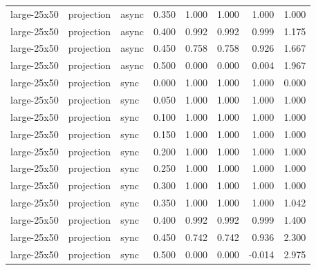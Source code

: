 \begin{tabular}{lllrrrrr}
large-25x50 & projection & async & 0.350 & 1.000 & 1.000 & 1.000 & 1.000 \\

large-25x50 & projection & async & 0.400 & 0.992 & 0.992 & 0.999 & 1.175 \\

large-25x50 & projection & async & 0.450 & 0.758 & 0.758 & 0.926 & 1.667 \\

large-25x50 & projection & async & 0.500 & 0.000 & 0.000 & 0.004 & 1.967 \\

large-25x50 & projection & sync & 0.000 & 1.000 & 1.000 & 1.000 & 0.000 \\

large-25x50 & projection & sync & 0.050 & 1.000 & 1.000 & 1.000 & 1.000 \\

large-25x50 & projection & sync & 0.100 & 1.000 & 1.000 & 1.000 & 1.000 \\

large-25x50 & projection & sync & 0.150 & 1.000 & 1.000 & 1.000 & 1.000 \\

large-25x50 & projection & sync & 0.200 & 1.000 & 1.000 & 1.000 & 1.000 \\

large-25x50 & projection & sync & 0.250 & 1.000 & 1.000 & 1.000 & 1.000 \\

large-25x50 & projection & sync & 0.300 & 1.000 & 1.000 & 1.000 & 1.000 \\

large-25x50 & projection & sync & 0.350 & 1.000 & 1.000 & 1.000 & 1.042 \\

large-25x50 & projection & sync & 0.400 & 0.992 & 0.992 & 0.999 & 1.400 \\

large-25x50 & projection & sync & 0.450 & 0.742 & 0.742 & 0.936 & 2.300 \\

large-25x50 & projection & sync & 0.500 & 0.000 & 0.000 & -0.014 & 2.975 \\

\bottomrule

\end{tabular}

